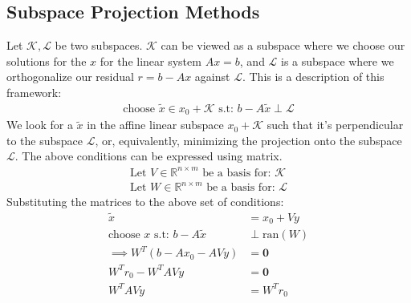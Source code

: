 \documentclass[]{article}
\theoremstyle{definition}
\begin{document}
    \subsection{Subspace Projection Methods}\label{sec:Subspace_Projection_Methods}
        Let $\mathcal K, \mathcal L$ be two subspaces. $\mathcal K$ can be viewed as a subspace where we choose our solutions for the $x$ for the linear system $Ax = b$, and $\mathcal L$ is a subspace where we orthogonalize our residual $r = b - Ax$ against $\mathcal L$. This is a description of this framework: 
        \begin{align}
            \text{choose }\tilde{x} \in x_0 + \mathcal{K} \text{ s.t: } b - A\tilde{x} \perp \mathcal{L}
        \end{align}
        We look for a $\tilde x$ in the affine linear subspace $x_0 + \mathcal{K}$ such that it's perpendicular to the subspace $\mathcal{L}$, or, equivalently, minimizing the projection onto the subspace $\mathcal{L}$. The above conditions can be expressed using matrix. 
        \begin{align}
            \text{Let } V \in \mathbb{R}^{n\times m} \text{ be a basis for: }\mathcal{K}
            \\
            \text{Let } W \in \mathbb{R}^{n\times m} \text{ be a basis for: } \mathcal{L}
        \end{align}
        Substituting the matrices to the above set of conditions: 
        \begin{align}
            \tilde{x} &= x_0 + Vy
            \\
            \text{choose } x \text{ s.t: } b - A\tilde{x}  &\perp \text{ran}(W)
            \\
            \implies W^T(b - Ax_0 - AVy) &= \mathbf{0}
            \\
            W^Tr_0 - W^TAVy&= \mathbf{0}
            \\
            W^TAVy &= W^Tr_0
        \end{align}
\end{document}
